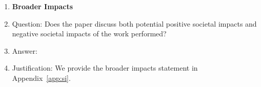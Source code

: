 \begin{enumerate}
\item {\bf Broader Impacts}
    \item[] Question: Does the paper discuss both potential positive societal impacts and negative societal impacts of the work performed?
    \item[] Answer: \answerYes{} %
    \item[] Justification: We provide the broader impacts statement in Appendix~\ref{app:si}.
    

\end{enumerate}
